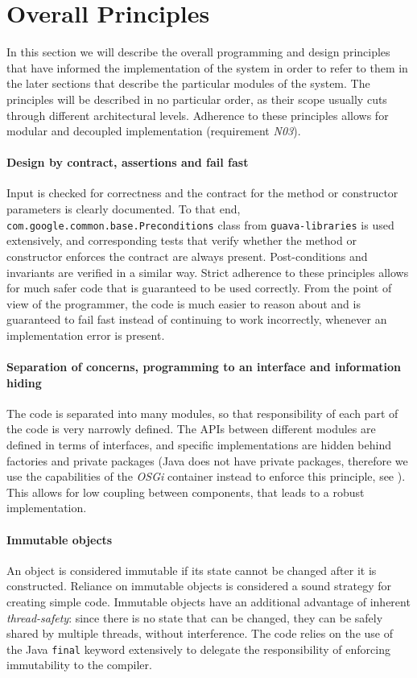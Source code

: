 \section{Overall Principles}
\label{Chapters/Implementation/Overall-Principles}
In this section we will describe the overall programming and design principles that have informed the implementation of the system in order to refer to them in the later sections that describe the particular modules of the system. The principles will be described in no particular order, as their scope usually cuts through different architectural levels. Adherence to these principles allows for modular and decoupled implementation (requirement \textit{N03}).

\paragraph{Design by contract, assertions and fail fast} 
Input is checked for correctness and the contract for the method or constructor parameters is clearly documented. To that end, \texttt{com.google.common.base.Preconditions} class from \texttt{guava-libraries}\cite{guava} is used extensively, and corresponding tests that verify whether the method or constructor enforces the contract are always present. Post-conditions and invariants are verified in a similar way. Strict adherence to these principles allows for much safer code that is guaranteed to be used correctly. From the point of view of the programmer, the code is much easier to reason about and is guaranteed to fail fast instead of continuing to work incorrectly,  whenever an implementation error is present.

\paragraph{Separation of concerns, programming to an interface and information hiding}
The code is separated into many modules, so that responsibility of each part of the code is very narrowly defined. The APIs between different modules are defined in terms of interfaces, and specific implementations are hidden behind factories and private packages (Java does not have private packages, therefore we use the capabilities of the \textit{OSGi} container instead to enforce this principle, see ). This allows for low coupling between components, that leads to a robust implementation.

\paragraph{Immutable objects}
An object is considered immutable if its state cannot be changed after it is constructed. Reliance on immutable objects is considered a sound strategy for creating simple code. Immutable objects have an additional advantage of inherent \textit{thread-safety}: since there is no state that can be changed, they can be safely shared by multiple threads, without interference. The code relies on the use of the Java \texttt{final} keyword extensively to delegate the responsibility of enforcing immutability to the compiler.